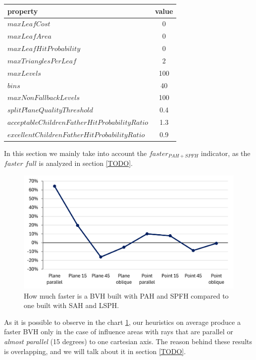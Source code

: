 \documentclass{PoliMi_MasterThesis}
\begin{document}
\begin{table}[H]
	\centering
	\begin{tabular}{| l | c |}
		\hline
		\textbf{property} & \textbf{value}\\
		\hline
		\hline
		$maxLeafCost$ & 0\\
		$maxLeafArea$ & 0\\
		$maxLeafHitProbability$ & 0\\
		$maxTrianglesPerLeaf$ & 2\\
		$maxLevels$ & 100\\
		$bins$ & 40\\
		$maxNonFallbackLevels$ & 100\\
		$splitPlaneQualityThreshold$ & 0.4\\
		$acceptableChildrenFatherHitProbabilityRatio$ & 1.3\\
		$excellentChildrenFatherHitProbabilityRatio$ & 0.9\\
		\hline
	\end{tabular}
\end{table}

In this section we mainly take into account the $faster_{PAH+SPFH}$ indicator, as the $faster \; full$ is analyzed in section \ref{TODO}.

\begin{figure}[H] 
	\includegraphics[width=\textwidth]{Images/pah_without_fallback_faster_chart.png}
	\caption{How much faster is a BVH built with PAH and SPFH compared to one built with SAH and LSPH.}
	\label{fig:pah_without_fallback_faster_chart}
\end{figure}

As it is possible to observe in the chart \ref{fig:pah_without_fallback_faster_chart}, our heuristics on average produce a faster BVH only in the case of influence areas with rays that are parallel or \textit{almost parallel} (15 degrees) to one cartesian axis. The reason behind these results is overlapping, and we will talk about it in section \ref{TODO}.
\end{document}

